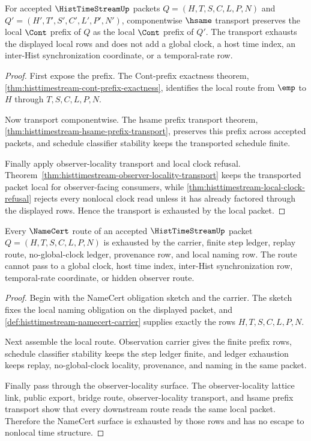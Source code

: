 \begin{theorem}
\label{thm:hist-time-stream-local-transport-exhaustion}
For accepted $\HistTimeStreamUp$ packets $Q=(H,T,S,C,L,P,N)$ and $Q'=(H',T',S',C',L',P',N')$, componentwise $\hsame$ transport preserves the local $\Cont$ prefix of $Q$ as the local $\Cont$ prefix of $Q'$. The transport exhausts the displayed local rows and does not add a global clock, a host time index, an inter-Hist synchronization coordinate, or a temporal-rate row.
\end{theorem}
\begin{proof}
First expose the prefix. The Cont-prefix exactness theorem, \autoref{thm:histtimestream-cont-prefix-exactness}, identifies the local route from $\emp$ to $H$ through $T,S,C,L,P,N$.

Now transport componentwise. The hsame prefix transport theorem, \autoref{thm:histtimestream-hsame-prefix-transport}, preserves this prefix across accepted packets, and schedule classifier stability keeps the transported schedule finite.

Finally apply observer-locality transport and local clock refusal. Theorem~\ref{thm:histtimestream-observer-locality-transport} keeps the transported packet local for observer-facing consumers, while \autoref{thm:histtimestream-local-clock-refusal} rejects every nonlocal clock read unless it has already factored through the displayed rows. Hence the transport is exhausted by the local packet.
\end{proof}

\begin{theorem}
\label{thm:hist-time-stream-namecert-route-exhaustion}
Every $\NameCert$ route of an accepted $\HistTimeStreamUp$ packet $Q=(H,T,S,C,L,P,N)$ is exhausted by the carrier, finite step ledger, replay route, no-global-clock ledger, provenance row, and local naming row. The route cannot pass to a global clock, host time index, inter-Hist synchronization row, temporal-rate coordinate, or hidden observer route.
\end{theorem}
\begin{proof}
Begin with the NameCert obligation sketch and the carrier. The sketch fixes the local naming obligation on the displayed packet, and \autoref{def:histtimestream-namecert-carrier} supplies exactly the rows $H,T,S,C,L,P,N$.

Next assemble the local route. Observation carrier gives the finite prefix rows, schedule classifier stability keeps the step ledger finite, and ledger exhaustion keeps replay, no-global-clock locality, provenance, and naming in the same packet.

Finally pass through the observer-locality surface. The observer-locality lattice link, public export, bridge route, observer-locality transport, and hsame prefix transport show that every downstream route reads the same local packet. Therefore the NameCert surface is exhausted by those rows and has no escape to nonlocal time structure.
\end{proof}

